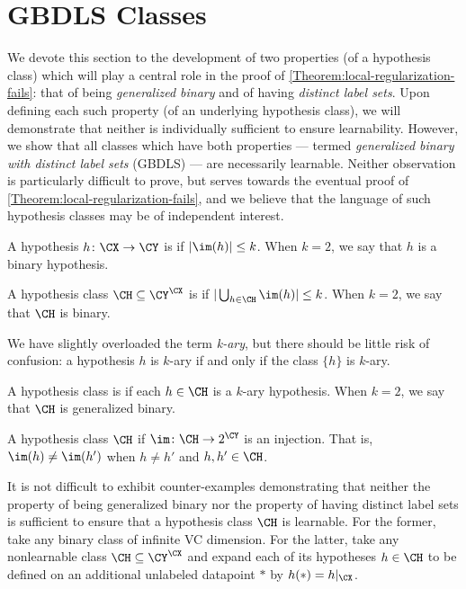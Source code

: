 \section{GBDLS Classes}\label{Section:GBDLS}

We devote this section to the development of two properties (of a hypothesis class) which will play a central role in the proof of \cref{Theorem:local-regularization-fails}: that of being \emph{generalized binary} and of having \emph{distinct label sets}. Upon defining each such property (of an underlying hypothesis class), we will demonstrate that neither is individually sufficient to ensure learnability. However, we show that all classes which have both properties --- termed \emph{generalized binary with distinct label sets} (GBDLS) --- are necessarily learnable. Neither observation is particularly difficult to prove, but serves towards the eventual proof of \cref{Theorem:local-regularization-fails}, and we believe that the language of such hypothesis classes may be of independent interest. 

\begin{definition}
A hypothesis $h \colon \CX \to \CY$ is  if $|\im(h)| \leq k$. When $k = 2$, we say that $h$ is a binary hypothesis. 
\end{definition}

\begin{definition}
A hypothesis class $\CH \subseteq \CY^\CX$ is  if $|\bigcup_{h \in \CH} \im(h)| \leq k$. When $k = 2$, we say that $\CH$ is binary. 
\end{definition}

We have slightly overloaded the term \emph{k-ary}, but there should be little risk of confusion: a hypothesis $h$ is $k$-ary if and only if the class $\{h\}$ is $k$-ary. 

\begin{definition}
A hypothesis class is  if each $h \in \CH$ is a $k$-ary hypothesis. When $k = 2$, we say that $\CH$ is generalized binary.
\end{definition}

\begin{definition}
A hypothesis class $\CH$  if $\im \colon \CH \to 2^{\CY}$ is an injection. That is, $\im(h) \neq \im(h')$ when $h \neq h'$ and $h, h' \in \CH$. 
\end{definition}

It is not difficult to exhibit counter-examples demonstrating that neither the property of being generalized binary nor the property of having distinct label sets is sufficient to ensure that a hypothesis class $\CH$ is learnable. For the former, take any binary class of infinite VC dimension. For the latter, take any nonlearnable class $\CH \subseteq \CY^\CX$ and expand each of its hypotheses $h \in \CH$ to be defined on an additional unlabeled datapoint $*$ by $h(*) = h|_{\CX}$. 

